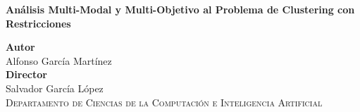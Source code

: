 \begin{titlepage}
 
 
\setlength{\centeroffset}{-0.5\oddsidemargin}
\addtolength{\centeroffset}{0.5\evensidemargin}
\thispagestyle{empty}

\noindent\hspace*{\centeroffset}\begin{minipage}{\textwidth}

\centering

% 

 \vspace{3.3cm}

 \vspace{0.5cm}


{\large\bfseries Análisis Multi-Modal y Multi-Objetivo al Problema de Clustering con Restricciones\\
}
\end{minipage}

\vspace{2.5cm}
\noindent\hspace*{\centeroffset}\begin{minipage}{\textwidth}
\centering

\textbf{Autor}\\ {Alfonso García Martínez}\\[2.5ex]
\textbf{Director}\\
{Salvador García López\\[2cm]}
\textsc{Departamento de Ciencias de la Computación e Inteligencia Artificial}\\
\end{minipage}

 
\end{titlepage}
